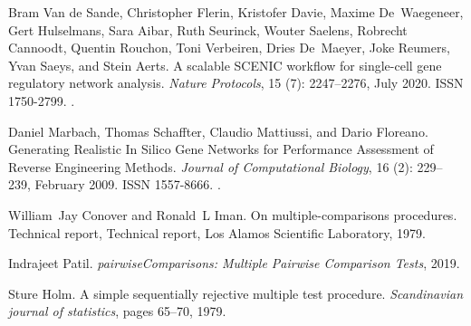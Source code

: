 \documentclass[10pt, a4paper]{article}
\begin{document}
\begin{thebibliography}{59}
	Bram {Van de Sande}, Christopher Flerin, Kristofer Davie, Maxime De~Waegeneer,
	Gert Hulselmans, Sara Aibar, Ruth Seurinck, Wouter Saelens, Robrecht
	Cannoodt, Quentin Rouchon, Toni Verbeiren, Dries De~Maeyer, Joke Reumers,
	Yvan Saeys, and Stein Aerts.
	\newblock A scalable {{SCENIC}} workflow for single-cell gene regulatory
	network analysis.
	\newblock \emph{Nature Protocols}, 15 (7): 2247--2276, July
	2020.
	\newblock ISSN 1750-2799.
	\newblock {}.
	
	Daniel Marbach, Thomas Schaffter, Claudio Mattiussi, and Dario Floreano.
	\newblock Generating {{Realistic In Silico Gene Networks}} for {{Performance
			Assessment}} of {{Reverse Engineering Methods}}.
	\newblock \emph{Journal of Computational Biology}, 16 (2):
	229--239, February 2009.
	\newblock ISSN 1557-8666.
	\newblock {}.
	
	William~Jay Conover and Ronald~L Iman.
	\newblock On multiple-comparisons procedures.
	\newblock Technical report, {Technical report, Los Alamos Scientific
		Laboratory}, 1979.
	
	Indrajeet Patil.
	\newblock \emph{{{pairwiseComparisons}}: {{Multiple}} Pairwise Comparison
		Tests}, 2019.
	
	Sture Holm.
	\newblock A simple sequentially rejective multiple test procedure.
	\newblock \emph{Scandinavian journal of statistics}, pages 65--70, 1979.
	
\end{thebibliography}
\end{document}
